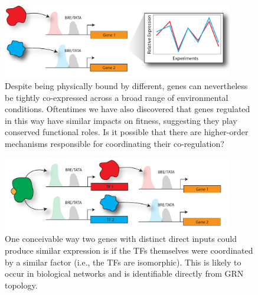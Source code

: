 \begin{figure}[h!]
    \centering
    \includegraphics[width=0.9\textwidth]{figures/equif_iso}
 	\caption[Co-regulation beyond common TF interaction]{Despite being physically bound by different, genes can nevertheless be tightly co-expressed across a broad range of environmental conditions. Oftentimes we have also discovered that genes regulated in this way have similar impacts on fitness, suggesting they play conserved functional roles. Is it possible that there are higher-order mechanisms responsible for coordinating their co-regulation?}

\label{fig:chap5:equif_iso}
\end{figure}

\begin{figure}[h!]
    \centering
    \includegraphics[width=0.9\textwidth]{figures/iso}
 	\caption[Indirect co-regulation by isomorphy]{One conceivable way two genes with distinct direct inputs could produce similar expression is if the TFs themselves were coordinated by a similar factor (i.e., the TFs are isomorphic). This is likely to occur in biological networks and is identifiable directly from GRN topology. 
 	}
 \label{fig:chap5:iso}
\end{figure}

